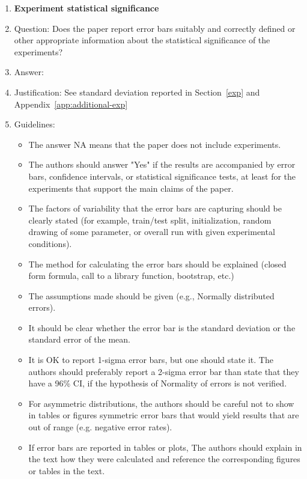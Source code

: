 \documentclass{article}
\theoremstyle{plain}
\theoremstyle{definition}
\theoremstyle{remark}
\begin{document}
\begin{enumerate}
\item {\bf Experiment statistical significance}
    \item[] Question: Does the paper report error bars suitably and correctly defined or other appropriate information about the statistical significance of the experiments?
    \item[] Answer: \answerYes{}%
    \item[] Justification: See standard deviation reported in Section~\ref{exp} and Appendix~\ref{app:additional-exp}
    \item[] Guidelines:
    \begin{itemize}
        \item The answer NA means that the paper does not include experiments.
        \item The authors should answer "Yes" if the results are accompanied by error bars, confidence intervals, or statistical significance tests, at least for the experiments that support the main claims of the paper.
        \item The factors of variability that the error bars are capturing should be clearly stated (for example, train/test split, initialization, random drawing of some parameter, or overall run with given experimental conditions).
        \item The method for calculating the error bars should be explained (closed form formula, call to a library function, bootstrap, etc.)
        \item The assumptions made should be given (e.g., Normally distributed errors).
        \item It should be clear whether the error bar is the standard deviation or the standard error of the mean.
        \item It is OK to report 1-sigma error bars, but one should state it. The authors should preferably report a 2-sigma error bar than state that they have a 96\% CI, if the hypothesis of Normality of errors is not verified.
        \item For asymmetric distributions, the authors should be careful not to show in tables or figures symmetric error bars that would yield results that are out of range (e.g. negative error rates).
        \item If error bars are reported in tables or plots, The authors should explain in the text how they were calculated and reference the corresponding figures or tables in the text.
    \end{itemize}


\end{enumerate}
\end{document}
